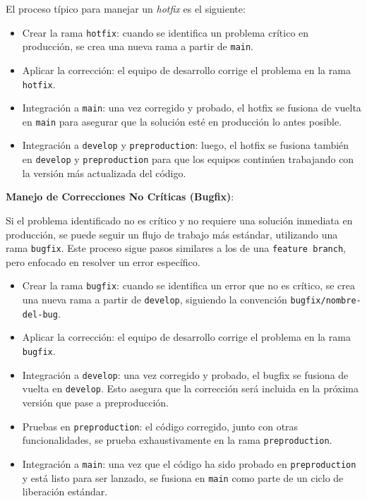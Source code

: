 \documentclass{template/uem_theme}
\begin{document}
El proceso típico para manejar un \textit{hotfix} es el siguiente:

\begin{itemize}
    \item Crear la rama \texttt{hotfix}: cuando se identifica un problema crítico en producción, se crea una nueva rama a partir de \texttt{main}.
    \item Aplicar la corrección: el equipo de desarrollo corrige el problema en la rama \texttt{hotfix}.
    \item Integración a \texttt{main}: una vez corregido y probado, el hotfix se fusiona de vuelta en \texttt{main} para asegurar que la solución esté en producción lo antes posible.
    \item Integración a \texttt{develop} y \texttt{preproduction}: luego, el hotfix se fusiona también en \texttt{develop} y \texttt{preproduction} para que los equipos continúen trabajando con la versión más actualizada del código.
\end{itemize}

\textbf{Manejo de Correcciones No Críticas (Bugfix)}:

Si el problema identificado no es crítico y no requiere una solución inmediata en producción, se puede seguir un flujo de trabajo más estándar, utilizando una rama \texttt{bugfix}. Este proceso sigue pasos similares a los de una \texttt{feature branch}, pero enfocado en resolver un error específico.

\begin{itemize}
    \item Crear la rama \texttt{bugfix}: cuando se identifica un error que no es crítico, se crea una nueva rama a partir de \texttt{develop}, siguiendo la convención \texttt{bugfix/nombre-del-bug}.
    \item Aplicar la corrección: el equipo de desarrollo corrige el problema en la rama \texttt{bugfix}.
    \item Integración a \texttt{develop}: una vez corregido y probado, el bugfix se fusiona de vuelta en \texttt{develop}. Esto asegura que la corrección será incluida en la próxima versión que pase a preproducción.
    \item Pruebas en \texttt{preproduction}: el código corregido, junto con otras funcionalidades, se prueba exhaustivamente en la rama \texttt{preproduction}.
    \item Integración a \texttt{main}: una vez que el código ha sido probado en \texttt{preproduction} y está listo para ser lanzado, se fusiona en \texttt{main} como parte de un ciclo de liberación estándar.
\end{itemize}
\end{document}

